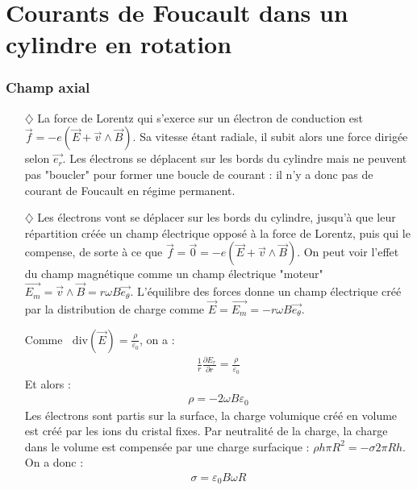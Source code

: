 \documentclass{report}
\newcommand*\diver{\mathop{}\!\mathrm{div}}
\begin{document}
\newpage

\section*{Courants de Foucault dans un cylindre en rotation}

\subsubsection*{Champ axial}

\begin{itemize}

	\item[$\diamondsuit$] La force de Lorentz qui s'exerce sur un électron de conduction est $\vec{f}=-e(\vec{E}+\vec{v}\wedge\vec{B})$. Sa vitesse étant radiale, il subit alors une force dirigée selon $\vec{e_r}$. Les électrons se déplacent sur les bords du cylindre mais ne peuvent pas "boucler" pour former une boucle de courant : il n'y a donc pas de courant de Foucault en régime permanent.
	
	\item[$\diamondsuit$] Les électrons vont se déplacer sur les bords du cylindre, jusqu'à que leur répartition créée un champ électrique opposé à la force de Lorentz, puis qui le compense, de sorte à ce que $\vec{f}=\vec{0}=-e(\vec{E}+\vec{v}\wedge\vec{B})$. On peut voir l'effet du champ magnétique comme un champ électrique "moteur" $\vec{E_m}=\vec{v}\wedge\vec{B}=r\omega B\vec{e_\theta}$. L'équilibre des forces donne un champ électrique créé par la distribution de charge comme $\vec{E}=\vec{E_m}=-r\omega B\vec{e_\theta}$.
	
	Comme $\diver(\vec{E})=\frac{\rho}{\varepsilon_0}$, on a :
	\begin{align*}
		\frac{1}{r}\frac{\partial E_r}{\partial r} 	= \frac{\rho}{\varepsilon_0}
	\end{align*}
	Et alors :
	\begin{align*}
		\rho = -2\omega B\varepsilon_0
	\end{align*}
	Les électrons sont partis sur la surface, la charge volumique créé en volume est créé par les ions du cristal fixes. Par neutralité de la charge, la charge dans le volume est compensée par une charge surfacique : $\rho h\pi R^2=-\sigma 2\pi Rh$. On a donc :
	\begin{align*}
		\sigma = \varepsilon_0 B\omega R
	\end{align*}
 
\end{itemize}
\end{document}

